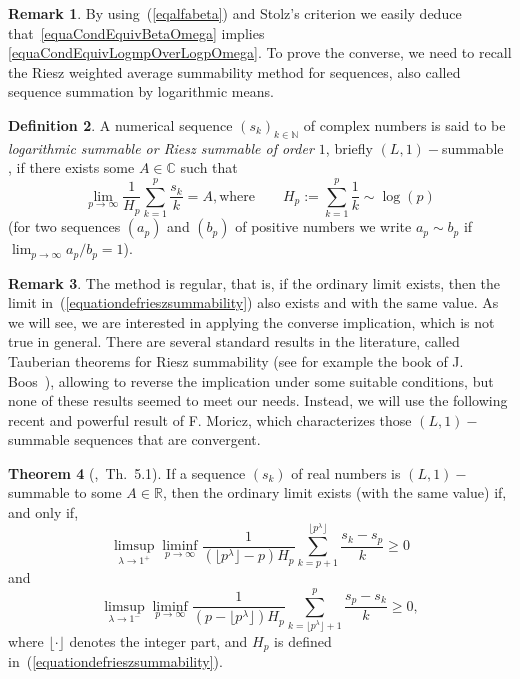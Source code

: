 \documentclass[11pt,a4paper]{article}
\theoremstyle{definition}
\newtheorem{theo}{Theorem}[section]
\newtheorem{defi}[theo]{Definition}
\newtheorem{rema}[theo]{Remark}
\def\oo{\infty}
\def\ri{\rightarrow}
\def\N{\mathbb{N}}
\def\R{\mathbb{R}}
\def\C{\mathbb{C}}      %
\begin{document}
\begin{rema}\label{remaRieszMethod}
By using~(\ref{eqalfabeta}) and Stolz's criterion we easily deduce that~\eqref{equaCondEquivBetaOmega} implies \eqref{equaCondEquivLogmpOverLogpOmega}.
To prove the converse, we need to recall the Riesz weighted average summability method for sequences, also called sequence summation by logarithmic means.
\end{rema}


\begin{defi}
A numerical sequence $(s_k)_{k\in\N}$ of complex numbers is said to be \textit{logarithmic summable or Riesz summable of order $1$}, briefly $(L, 1)-$summable , if there exists some $A\in\C$ such that
\begin{equation}\label{equationdefrieszsummability}
 \lim_{p\ri\oo} \frac{1}{H_p}\sum^p_{k=1}\frac{s_k}{k}=A, \text{where} \qquad H_p:=\sum^p_{k=1} \frac{1}{k} \sim \log(p)
\end{equation}
(for two sequences $(a_p)$ and $(b_p)$ of positive numbers we write $a_p\sim b_p$ if
$\lim_{p\ri\oo} a_p/b_p =1$).
\end{defi}

\begin{rema}
The method is regular, that is, if the ordinary limit
exists, then the limit in~(\ref{equationdefrieszsummability}) also exists and with the same value. As we will see, we are interested in applying the converse implication, which is not true in general. There are several standard results in the literature, called Tauberian theorems for Riesz summability (see for example the book of J. Boos~\cite{Boos}), allowing to reverse the implication under some suitable conditions, but none of these results seemed to meet our needs. Instead, we will use the following recent and powerful result of F. Moricz, which characterizes those $(L, 1)-$summable sequences that are convergent.
\end{rema}

\begin{theo}[\cite{Moricz},\ Th.\ 5.1]\label{theoMoricz}
If a sequence $(s_k)$ of real numbers is $(L, 1)-$summable to some $A\in\R$, then the ordinary limit exists (with the same value) if, and only if,
\begin{equation}\label{eqmoricz1}
 \limsup_{\lambda\ri1^+}\liminf_{p\ri\oo} \frac{1}{(\lfloor p^\lambda\rfloor-p)H_p}\sum_{k=p+1}^{\lfloor p^\lambda\rfloor}\frac{s_k-s_p}{k}\geq 0
\end{equation}
and
\begin{equation}\label{eqmoricz2}
 \limsup_{\lambda\ri1^-}\liminf_{p\ri\oo} \frac{1}{(p-\lfloor p^\lambda\rfloor )H_p}\sum^{p}_{k= \lfloor p^\lambda\rfloor+1}\frac{s_p-s_k}{k}\geq 0,
\end{equation}
where $\lfloor \cdot \rfloor$ denotes the integer part, and $H_p$ is defined in~(\ref{equationdefrieszsummability}).
\end{theo}
\end{document}
